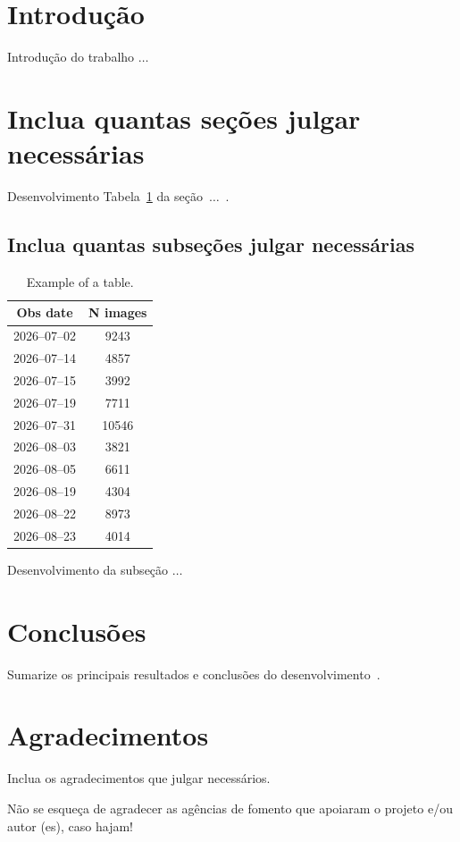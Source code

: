 
\section{Introdução}\label{sec:introducao}
\onehalfspacing%

Introdução do trabalho \(\ldots\)%

\section{Inclua quantas seções julgar necessárias}\label{sec:section1}

Desenvolvimento Tabela~\ref{tab:obs_nights} da seção~\(\ldots\)~\cite{mesquita2016}.


\subsection{Inclua quantas subseções julgar necessárias}\label{subsec:subsection1}

\begin{table}[h!]
    \centering
    \caption{Example of a table.}%
    \label{tab:obs_nights}
    \begin{tabular}{cc}
        \toprule
        Obs date     & N images \\
        \midrule
        2026--07--02 & 9243     \\
        2026--07--14 & 4857     \\
        2026--07--15 & 3992     \\
        2026--07--19 & 7711     \\
        2026--07--31 & 10546    \\
        2026--08--03 & 3821     \\
        2026--08--05 & 6611     \\
        2026--08--19 & 4304     \\
        2026--08--22 & 8973     \\
        2026--08--23 & 4014     \\
        \bottomrule
    \end{tabular}
\end{table}

Desenvolvimento da subseção \(\ldots\)~\cite{einstein1905}

\section{Conclusões}\label{sec:conclusoes}

Sumarize os principais resultados e conclusões do desenvolvimento~\cite{latexcompanion}.


\section{Agradecimentos}

Inclua os agradecimentos que julgar necessários.

\vspace{0.5cm}

Não se esqueça de agradecer as agências de fomento que apoiaram o projeto e/ou autor (es), caso hajam!



